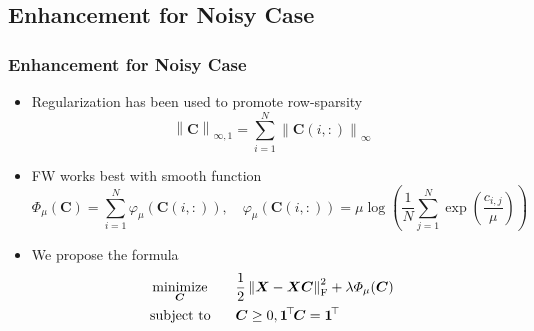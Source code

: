 \documentclass[10pt,xcolor={usenames,dvipsnames,table}]{beamer}
\def\blue{\color{blue}}
\newcommand{\norm}[1]{\left\lVert#1\right\rVert}
\newcommand{\T}{\!\top\!}
\DeclareMathOperator*{\minimize}{minimize}
\newcommand{\citep}[1]{{\blue \scriptsize \parencite{#1}}}
\begin{document}
\subsection{Enhancement for Noisy Case}%
\begin{frame}[label=fine]
    \frametitle{Enhancement for Noisy Case}
    \begin{itemize}
        \item Regularization has been used to promote row-sparsity \citep{fu2015robust,esser2012convex}
\[
\norm{\bm{C}}_{\infty, 1} = \sum^{N}_{i=1} \norm{\bm{C}(i, :)}_{\infty}
\] 
\item FW works best with smooth function 
    \[
    \varPhi_{\mu}(\bm{C}) = \sum^{N}_{i=1} \varphi_{\mu}(\bm{C}(i, :)) , \quad \varphi_{\mu}(\bm{C}(i, :)) = \mu \log \left( \dfrac{1}{N} \sum^{N}_{j=1} \exp \left(\dfrac{c_{i, j}}{\mu} \right) \right)
    \] 
\item We propose the formula
    \label{problem:noiseless}
    \begin{alignat*}{2}
        & \minimize_{\bm{C}} \quad && \dfrac{1}{2}\norm{\bm{X} - \bm{X}\bm{C}}_{\rm F}^2 + \lambda \varPhi_{\mu}(\bm{C}) \\
        & \text{\rm subject to} && \bm{C} \geq 0, \bm{1}^{\T}\bm{C} = \bm{1}^{\T}
    \end{alignat*}
    \end{itemize}

\end{frame}
\end{document}
